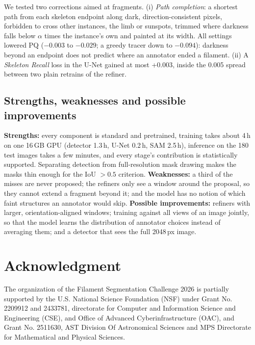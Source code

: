 \documentclass[sigconf]{acmart}
\begin{document}
We tested two corrections aimed at fragments. (i) \emph{Path completion}: a shortest path from each skeleton endpoint along dark, direction-consistent pixels, forbidden to cross other instances, the limb or sunspots, trimmed where darkness falls below $\alpha$ times the instance's own and painted at its width. All settings lowered PQ ($-0.003$ to $-0.029$; a greedy tracer down to $-0.094$): darkness beyond an endpoint does not predict where an annotator ended a filament. (ii) A \emph{Skeleton Recall} loss in the U-Net gained at most +0.003, inside the 0.005 spread between two plain retrains of the refiner.

\subsection{Strengths, weaknesses and possible improvements}
\textbf{Strengths:} every component is standard and pretrained, training takes about 4\,h on one 16\,GB GPU (detector 1.3\,h, U-Net 0.2\,h, SAM 2.5\,h), inference on the 180 test images takes a few minutes, and every stage's contribution is statistically supported. Separating detection from full-resolution mask drawing makes the masks thin enough for the IoU $>0.5$ criterion. \textbf{Weaknesses:} a third of the misses are never proposed; the refiners only see a window around the proposal, so they cannot extend a fragment beyond it; and the model has no notion of which faint structures an annotator would skip. \textbf{Possible improvements:} refiners with larger, orientation-aligned windows; training against all views of an image jointly, so that the model learns the distribution of annotator choices instead of averaging them; and a detector that sees the full 2048\,px image.


\section{Acknowledgment}\label{sec:acknowledgment}
    The organization of the Filament Segmentation Challenge 2026 is partially supported by the U.S. National Science Foundation (NSF) under Grant No. 2209912 and 2433781, directorate for Computer and Information Science and Engineering (CSE), and Office of Advanced Cyberinfrastructure (OAC), and Grant No. 2511630, AST Division Of Astronomical Sciences and MPS Directorate for Mathematical and Physical Sciences.
\end{document}

